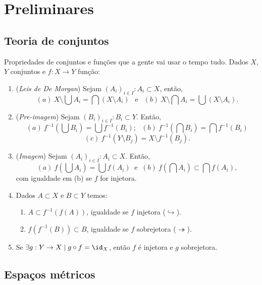 \section{Preliminares}
%
\subsection*{Teoria de conjuntos}
Propriedades de conjuntos e funções que a gente vai usar o tempo tudo. Dados \(X\), \(Y \) conjuntos e \(f:X \to Y\) função:

\begin{enumerate}[label = 1.\Alph*.]
\hypertarget{demorgan}{}
    \item (\emph{Leis de De Morgan}) Sejam \((A_i)_{i\in I} : A_i \subset X\), então, 
    \[(a)\ X\setminus \bigcup A_i = \bigcap (X \setminus A_i) \ \ \text{ e } \ \ (b) \ X\setminus \bigcap A_i = \bigcup (X\setminus A_i). \]
    \item (\emph{Pre-imagem}) Sejam \((B_i)_{i\in I} : B_i \subset Y\). Então,
    \[(a)\ f^{-1}\left(\bigcup B_i\right) = \bigcup f^{-1}(B_i); \ \ \ (b)\ f^{-1}\left(\bigcap B_i\right) = \bigcap f^{-1}(B_i)\]
    \[(c)\ f^{-1}\left(Y \setminus B_j\right) = X \setminus f^{-1}(B_j).\]
    \item (\emph{Imagem}) Sejam \((A_i)_{i\in I}  : A_i \subset X\). Então,
    \[(a)\ f\left(\bigcup A_i\right) = \bigcup f(A_i) \ \text{ \ e \ } \ (b)\ f\left(\bigcap A_i\right) \subset \bigcap f(A_i),\]
    com igualdade em (b) se \(f\) for injetora. 
    \item[1.E.] Dados \(A\subset X\) e \(B \subset Y\) temos:  
    \begin{enumerate}[label = (\alph*), left = -0.15cm]
        \item \( A \subset f^{-1}(f(A))\), igualdade se \(f\) injetora (\(\hookrightarrow\)). 
        \item \( f(f^{-1}(B)) \subset B \), igualdade se \(f\) sobrejetora (\(\twoheadrightarrow\)). 
    \end{enumerate}
    \item[1.G.] Se \(\exists g : Y \to X \mid g \circ f = \id_X\), então \(f\) é injetora e \(g\) sobrejetora. 
\end{enumerate}
%
\subsection*{Espaços métricos}

